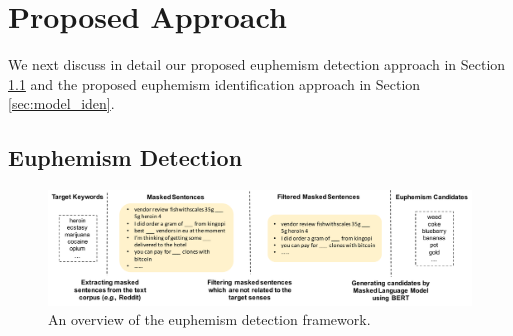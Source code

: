 
\section{Proposed Approach}
\label{sec:model}
We next discuss in detail our proposed euphemism detection approach in Section \ref{sec:model_det} and the proposed euphemism identification approach in Section \ref{sec:model_iden}. 


\subsection{Euphemism Detection}
\label{sec:model_det}
\begin{figure}
	\centering
	\includegraphics[width=1.0\linewidth]{figures/2}
	\caption{An overview of the euphemism detection framework.}
	\label{fig:model_det}
\end{figure}



